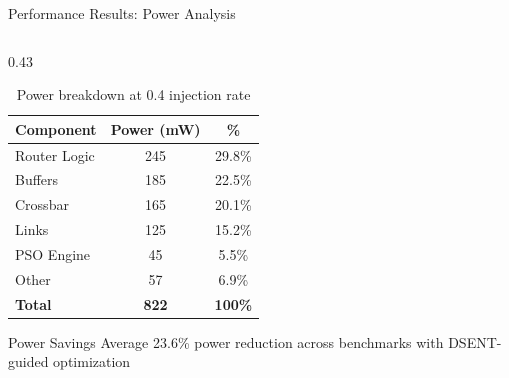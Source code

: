\documentclass[10pt,aspectratio=169]{beamer}
\begin{document}
\begin{frame}{Performance Results: Power Analysis}
\begin{columns}[T]
        \begin{column}{0.43\textwidth}
            \begin{table}[h]
                \centering
                \footnotesize
                \begin{tabular}{|l|c|c|}
                    \hline
                    \textbf{Component} & \textbf{Power (mW)} & \textbf{\%} \\
                    \hline
                    Router Logic & 245 & 29.8\% \\
                    Buffers & 185 & 22.5\% \\
                    Crossbar & 165 & 20.1\% \\
                    Links & 125 & 15.2\% \\
                    PSO Engine & 45 & 5.5\% \\
                    Other & 57 & 6.9\% \\
                    \hline
                    \textbf{Total} & \textbf{822} & \textbf{100\%} \\
                    \hline
                \end{tabular}
                \caption{Power breakdown at 0.4 injection rate}
            \end{table}
            
            \begin{alertblock}{Power Savings}
                Average 23.6\% power reduction across benchmarks with DSENT-guided optimization
            \end{alertblock}
        \end{column}
    \end{columns}
\end{frame}
\end{document}
